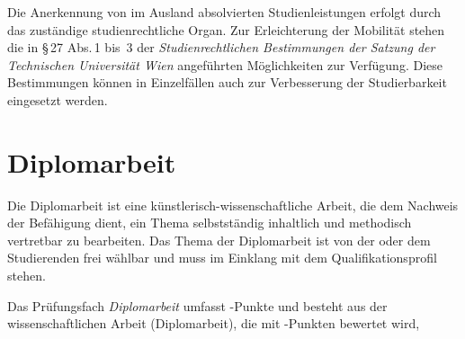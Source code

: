 Die Anerkennung von im Ausland absolvierten Studienleistungen erfolgt
durch das zuständige studienrechtliche Organ.  Zur Erleichterung der
Mobilität stehen die in \S\,27 Abs.\,1 bis~3 der
\emph{Studienrechtlichen Bestimmungen der Satzung der Technischen
  Universität Wien} angeführten Möglichkeiten zur Verfügung. Diese
Bestimmungen können in Einzelfällen auch zur Verbesserung der
Studierbarkeit eingesetzt werden.
%

%


\section{Diplomarbeit}\label{sec:DA}

\newcommand*\PFDA{%
  \ifDASEMINAR{%
    \LV{1,5}{1,0}{SE}{Seminar für Diplomand\_innen}[SeminarFuerDiplomandInnen]\\
    \ECTS{27,0} \hspace*{1.5mm} Diplomarbeit \\
    \hspace*{0.9mm} \ECTS{1,5} \hspace*{1.6mm} Kommissionelle Abschlussprüfung%
  }{%
    \ECTS{27,0} \hspace*{0.5mm} Diplomarbeit \\
    \hspace*{0.9mm} \ECTS{3,0} \hspace*{1.6mm} Kommissionelle Abschlussprüfung%
  }%
}
\let\PFDASem\PFDA %

Die Diplomarbeit ist eine künstlerisch-wissenschaftliche Arbeit, die 
dem Nachweis der Befähigung dient, ein Thema selbstständig
inhaltlich und methodisch vertretbar zu bearbeiten. Das Thema der
Diplomarbeit ist von der oder dem Studierenden frei wählbar und muss
im Einklang mit dem Qualifikationsprofil stehen.

Das Prüfungsfach \emph{Diplomarbeit} umfasst -Punkte
und besteht aus der wissenschaftlichen Arbeit (Diplomarbeit),
die mit -Punkten bewertet wird,
%

